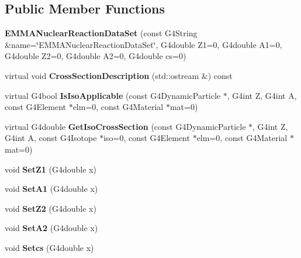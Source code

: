\subsection*{Public Member Functions}
\begin{DoxyCompactItemize}
\item 
\hypertarget{classEMMANuclearReactionDataSet_ac6ce5688d3bb9de1d639e24b47f15245}{{\bfseries E\-M\-M\-A\-Nuclear\-Reaction\-Data\-Set} (const G4\-String \&name=\char`\"{}E\-M\-M\-A\-Nuclear\-Reaction\-Data\-Set\char`\"{}, G4double Z1=0, G4double A1=0, G4double Z2=0, G4double A2=0, G4double cs=0)}\label{classEMMANuclearReactionDataSet_ac6ce5688d3bb9de1d639e24b47f15245}

\item 
\hypertarget{classEMMANuclearReactionDataSet_ac5aa08d400a30525da13daf02f7fa238}{virtual void {\bfseries Cross\-Section\-Description} (std\-::ostream \&) const }\label{classEMMANuclearReactionDataSet_ac5aa08d400a30525da13daf02f7fa238}

\item 
\hypertarget{classEMMANuclearReactionDataSet_adc664706b4d1ad09fdfe28a205573257}{virtual G4bool {\bfseries Is\-Iso\-Applicable} (const G4\-Dynamic\-Particle $\ast$, G4int Z, G4int A, const G4\-Element $\ast$elm=0, const G4\-Material $\ast$mat=0)}\label{classEMMANuclearReactionDataSet_adc664706b4d1ad09fdfe28a205573257}

\item 
\hypertarget{classEMMANuclearReactionDataSet_ab6e85d6188e926f67f51b6ab9d470d4c}{virtual G4double {\bfseries Get\-Iso\-Cross\-Section} (const G4\-Dynamic\-Particle $\ast$, G4int Z, G4int A, const G4\-Isotope $\ast$iso=0, const G4\-Element $\ast$elm=0, const G4\-Material $\ast$mat=0)}\label{classEMMANuclearReactionDataSet_ab6e85d6188e926f67f51b6ab9d470d4c}

\item 
\hypertarget{classEMMANuclearReactionDataSet_a3709810daaecd0ba9804357199fa0106}{void {\bfseries Set\-Z1} (G4double x)}\label{classEMMANuclearReactionDataSet_a3709810daaecd0ba9804357199fa0106}

\item 
\hypertarget{classEMMANuclearReactionDataSet_a7fec2b6dd1db2fe4fa136cba3cb0e4a5}{void {\bfseries Set\-A1} (G4double x)}\label{classEMMANuclearReactionDataSet_a7fec2b6dd1db2fe4fa136cba3cb0e4a5}

\item 
\hypertarget{classEMMANuclearReactionDataSet_a82d28fec9709967f5de59028a47d0a06}{void {\bfseries Set\-Z2} (G4double x)}\label{classEMMANuclearReactionDataSet_a82d28fec9709967f5de59028a47d0a06}

\item 
\hypertarget{classEMMANuclearReactionDataSet_a25657ad4f56aa81303d08888ea286025}{void {\bfseries Set\-A2} (G4double x)}\label{classEMMANuclearReactionDataSet_a25657ad4f56aa81303d08888ea286025}

\item 
\hypertarget{classEMMANuclearReactionDataSet_a609ed1be18e81560cfcfe4802388c41f}{void {\bfseries Setcs} (G4double x)}\label{classEMMANuclearReactionDataSet_a609ed1be18e81560cfcfe4802388c41f}

\end{DoxyCompactItemize}
